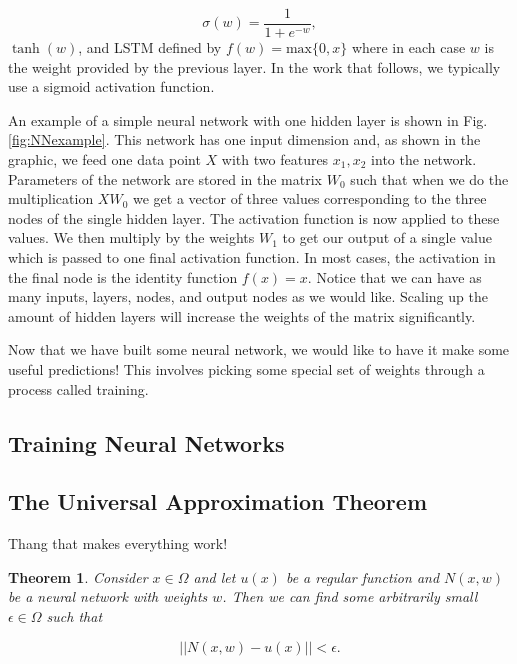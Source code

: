 \documentclass{CUP-JNL-DTM}%
\newtheorem{theorem}{Theorem}[section]
\theoremstyle{definition}
\numberwithin{equation}{section}
\begin{document}
\begin{equation}
    \sigma(w) = \frac{1}{1 + e^{-w}},
\end{equation}
$\tanh(w)$, and LSTM defined by $f(w) = \textrm{max}\{0,x\}$ where in each case $w$ is the weight provided by the previous layer. In the work that follows, we typically use a sigmoid activation function. 

An example of a simple neural network with one hidden layer is shown in Fig. \ref{fig:NNexample}. This network has one input dimension and, as shown in the graphic, we feed one data point $X$ with two features $x_1, x_2$ into the network. Parameters of the network are stored in the matrix $W_0$ such that when we do the multiplication $X W_0$ we get a vector of three values corresponding to the three nodes of the single hidden layer. The activation function is now applied to these values. We then multiply by the weights $W_1$ to get our output of a single value which is passed to one final activation function. In most cases, the activation in the final node is the identity function $f(x) = x$. Notice that we can have as many inputs, layers, nodes, and output nodes as we would like. Scaling up the amount of hidden layers will increase the weights of the matrix significantly. 

Now that we have built some neural network, we would like to have it make some useful predictions! This involves picking some special set of weights through a process called training. 

\subsection{Training Neural Networks}

\subsection{The Universal Approximation Theorem}

Thang that makes everything work!

\begin{theorem}

Consider $x \in \Omega$ and let $u(x)$ be a regular function and $N(x,w)$ be a neural network with weights $w$. Then we can find some arbitrarily small $\epsilon \in \Omega$ such that 

\begin{equation}
	||N(x,w) - u(x)|| < \epsilon. 
\end{equation}

\end{theorem}
\end{document}
